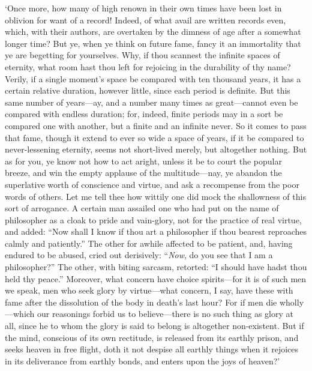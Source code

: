 \documentclass[11pt]{book}
\begin{document}
`Once more, how many of high renown in their own times have been lost in
oblivion for want of a record! Indeed, of what avail are written records
even, which, with their authors, are overtaken by the dimness of age
after a somewhat longer time? But ye, when ye think on future fame,
fancy it an immortality that ye are begetting for yourselves. Why, if
thou scannest the infinite spaces of eternity, what room hast thou left
for rejoicing in the durability of thy name? Verily, if a single
moment's space be compared with ten thousand years, it has a certain
relative duration, however little, since each period is definite. But
this same number of years---ay, and a number many times as great---cannot
even be compared with endless duration; for, indeed, finite periods may
in a sort be compared one with another, but a finite and an infinite
never. So it comes to pass that fame, though it extend to ever so wide a
space of years, if it be compared to never-lessening eternity, seems not
short-lived merely, but altogether nothing. But as for you, ye know not
how to act aright, unless it be to court the popular breeze, and win the
empty applause of the multitude---nay, ye abandon the superlative worth
of conscience and virtue, and ask a recompense from the poor words of
others. Let me tell thee how wittily one did mock the shallowness of
this sort of arrogance. A certain man assailed one who had put on the
name of philosopher as a cloak to pride and vain-glory, not for the
practice of real virtue, and added: ``Now shall I know if thou art a
philosopher if thou bearest reproaches calmly and patiently.'' The other
for awhile affected to be patient, and, having endured to be abused,
cried out derisively: ``\emph{Now}, do you see that I am a philosopher?'' The
other, with biting sarcasm, retorted: ``I should have hadst thou held thy
peace.'' Moreover, what concern have choice spirits---for it is of such
men we speak, men who seek glory by virtue---what concern, I say, have
these with fame after the dissolution of the body in death's last hour?
For if men die wholly---which our reasonings forbid us to believe---there
is no such thing as glory at all, since he to whom the glory is said to
belong is altogether non-existent. But if the mind, conscious of its own
rectitude, is released from its earthly prison, and seeks heaven in free
flight, doth it not despise all earthly things when it rejoices in its
deliverance from earthly bonds, and enters upon the joys of heaven?'



\end{document}

